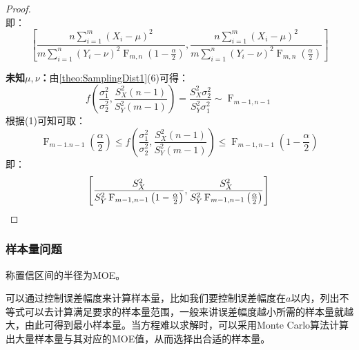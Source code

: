 \begin{proof}
\begin{equation*}
	\end{equation*}
	即：
	\begin{equation*}
		\left[\frac{n\sum\limits_{i=1}^{m}(X_i-\mu)^2}{m\sum\limits_{i=1}^{n}(Y_i-\nu)^2\operatorname{F}_{m,n}\left(1-\frac{\alpha}{2}\right)},\frac{n\sum\limits_{i=1}^{m}(X_i-\mu)^2}{m\sum\limits_{i=1}^{n}(Y_i-\nu)^2\operatorname{F}_{m,n}\left(\frac{\alpha}{2}\right)}\right]
	\end{equation*}\par
	\textbf{未知$\mu,\nu$：}由\cref{theo:SamplingDist1}(6)可得：
	\begin{equation*}
		f\left(\frac{\sigma_1^2}{\sigma_2^2},\frac{S_X^2(n-1)}{S_Y^2(m-1)}\right)=\frac{S_X^2\sigma_2^2}{S_Y^2\sigma_1^2}\sim\operatorname{F}_{m-1,n-1}
	\end{equation*}
	根据(1)可知可取：
	\begin{equation*}
		\operatorname{F}_{m-1.n-1}\left(\frac{\alpha}{2}\right)\leqslant f\left(\frac{\sigma_1^2}{\sigma_2^2},\frac{S_X^2(n-1)}{S_Y^2(m-1)}\right)\leqslant\operatorname{F}_{m-1,n-1}\left(1-\frac{\alpha}{2}\right)
	\end{equation*}
	即：
	\begin{equation*}
		\left[\frac{S_X^2}{S_Y^2\operatorname{F}_{m-1,n-1}\left(1-\frac{\alpha}{2}\right)},\frac{S_X^2}{S_Y^2\operatorname{F}_{m-1,n-1}\left(\frac{\alpha}{2}\right)}\right]\qedhere
	\end{equation*}
\end{proof}
\subsubsection{样本量问题}
\begin{definition}
	称置信区间的半径为\gls{MOE}。
\end{definition}
\begin{note}
	可以通过控制误差幅度来计算样本量，比如我们要控制误差幅度在$a$以内，列出不等式可以去计算满足要求的样本量范围，一般来讲误差幅度越小所需的样本量就越大，由此可得到最小样本量。当方程难以求解时，可以采用Monte Carlo算法计算出大量样本量与其对应的MOE值，从而选择出合适的样本量。
\end{note}